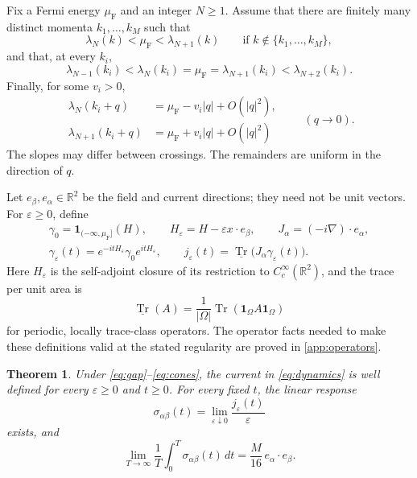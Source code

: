 \documentclass[11pt,a4paper]{article}
\newcommand{\R}{\mathbb R}
\newcommand{\ind}{\mathbf 1}
\newcommand{\trv}{\underline{\operatorname{Tr}}}
\DeclareMathOperator{\Tr}{Tr}
\newtheorem{theorem}{Theorem}[section]
\theoremstyle{remark}
\numberwithin{equation}{section}
\begin{document}
Fix a Fermi energy $\mu_{\mathrm F}$ and an integer $N\ge1$. Assume that
there are finitely many distinct momenta $k_1,\ldots,k_M$ such that
\begin{equation}\label{eq:gap}
 \lambda_N(k)<\mu_{\mathrm F}<\lambda_{N+1}(k)
 \qquad\text{if } k\notin\{k_1,\ldots,k_M\},
\end{equation}
and that, at every $k_i$,
\begin{equation}\label{eq:isolated}
 \lambda_{N-1}(k_i)<\lambda_N(k_i)=\mu_{\mathrm F}
 =\lambda_{N+1}(k_i)<\lambda_{N+2}(k_i).
\end{equation}
Finally, for some $v_i>0$,
\begin{equation}\label{eq:cones}
 \begin{aligned}
  \lambda_N(k_i+q)&=\mu_{\mathrm F}-v_i|q|+O(|q|^2),\\
  \lambda_{N+1}(k_i+q)&=\mu_{\mathrm F}+v_i|q|+O(|q|^2)
 \end{aligned}
 \qquad(q\longrightarrow0).
\end{equation}
The slopes may differ between crossings. The remainders are uniform in
the direction of $q$.

Let $e_\beta,e_\alpha\in\R^2$ be the field and current directions;
they need not be unit vectors. For $\varepsilon\ge0$, define
\begin{equation}\label{eq:dynamics}
 \begin{gathered}
 \gamma_0=\ind_{(-\infty,\mu_{\mathrm F}]}(H),\qquad
 H_\varepsilon=H-\varepsilon x\cdot e_\beta,\qquad
 J_\alpha=(-i\nabla)\cdot e_\alpha,\\
 \gamma_\varepsilon(t)
   =e^{-itH_\varepsilon}\gamma_0e^{itH_\varepsilon},\qquad
 j_\varepsilon(t)=\trv\bigl(J_\alpha\gamma_\varepsilon(t)\bigr).
 \end{gathered}
\end{equation}
Here $H_\varepsilon$ is the self-adjoint closure of its restriction to
$C_c^\infty(\R^2)$, and the trace per unit area is
\begin{equation}\label{eq:trace-def}
 \trv(A)=\frac1{|\Omega|}\Tr(\ind_\Omega A\ind_\Omega)
\end{equation}
for periodic, locally trace-class operators. The operator facts needed to
make these definitions valid at the stated regularity are proved in
\cref{app:operators}.

\begin{theorem}\label{thm:main}
Under \eqref{eq:gap}--\eqref{eq:cones}, the current in
\eqref{eq:dynamics} is well defined for every $\varepsilon\ge0$ and
$t\ge0$. For every fixed $t$, the linear response
\[
 \sigma_{\alpha\beta}(t)
   =\lim_{\varepsilon\downarrow0}\frac{j_\varepsilon(t)}{\varepsilon}
\]
exists, and
\begin{equation}\label{eq:main}
 \boxed{\displaystyle
 \lim_{T\to\infty}\frac1T\int_0^T\sigma_{\alpha\beta}(t)\,dt
     =\frac{M}{16}\,e_\alpha\cdot e_\beta.}
\end{equation}
\end{theorem}
\end{document}
